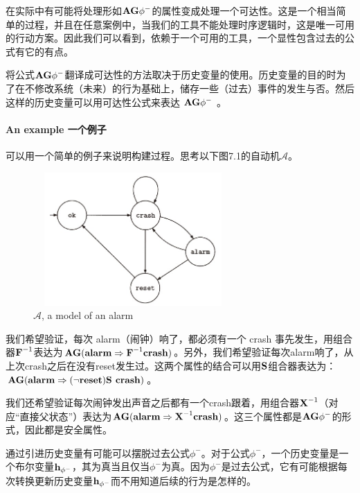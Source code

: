 \documentclass{book}
\begin{document}
    在实际中有可能将处理形如$\text{\textbf{AG}}\phi^-$的属性变成处理一个可达性。这是一个相当简单的过程，并且在任意案例中，当我们的工具不能处理时序逻辑时，这是唯一可用的行动方案。因此我们可以看到，依赖于一个可用的工具，一个显性包含过去的公式有它的有点。

    将公式$\text{\textbf{AG}}\phi^-$翻译成可达性的方法取决于历史变量的使用。历史变量的目的时为了在不修改系统（未来）的行为基础上，储存一些（过去）事件的发生与否。然后这样的历史变量可以用可达性公式来表达 $\text{\textbf{AG}}\phi^-$ 。

    \paragraph{An example 一个例子} 可以用一个简单的例子来说明构建过程。思考以下图7.1的自动机$\mathcal{A}$。
    \begin{figure}
        \centering
        \includegraphics[width=3.0in,height=2.0in]{7_1.jpg}
        \caption{$\mathcal{A}$, a model of an alarm}
    \end{figure}

    我们希望验证，每次 alarm（闹钟）响了，都必须有一个 crash 事先发生，用组合器$\text{\textbf{F}}^{-1}$表达为$\text{\textbf{AG}}(\text{\textbf{alarm}}\Rightarrow\text{\textbf{F}}^{-1}\text{\textbf{crash}})$。另外，我们希望验证每次alarm响了，从上次crash之后在没有reset发生过。这两个属性的结合可以用$\text{\textbf{S}}$组合器表达为：$\text{\textbf{AG}}(\text{\textbf{alarm}}\Rightarrow(\neg\text{\textbf{reset}})\text{\textbf{S crash}})$。

    我们还希望验证每次闹钟发出声音之后都有一个crash跟着，用组合器$\text{\textbf{X}}^{-1}$（对应“直接父状态”）表达为$\text{\textbf{AG}}(\text{\textbf{alarm}}\Rightarrow\text{\textbf{X}}^{-1}\text{\textbf{crash}})$。这三个属性都是$\text{\textbf{AG}}\phi^-$的形式，因此都是安全属性。

    通过引进历史变量有可能可以摆脱过去公式$\phi^-$。对于公式$\phi^-$，一个历史变量是一个布尔变量$\text{\textbf{h}}_ {\phi^-}$，其为真当且仅当$\phi^-$为真。因为$\phi^-$是过去公式，它有可能根据每次转换更新历史变量$\text{\textbf{h}}_ {\phi^-}$而不用知道后续的行为是怎样的。
\end{document}
